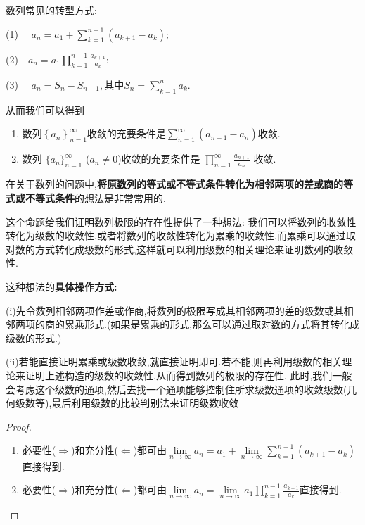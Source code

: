 \documentclass[../../main.tex]{subfiles}%
\begin{document}
\begin{proposition}[数列常见的转型方式]\label{proposition:数列收敛的级数与累乘形式}
数列常见的转型方式:

(1) $\quad a_n = a_1 + \sum_{k=1}^{n-1} \left( a_{k+1} - a_k \right); $

(2)$ \quad a_n = a_1 \prod_{k=1}^{n-1} \frac{a_{k+1}}{a_k}$; 

(3) $\quad a_n = S_n - S_{n-1}, \text{其中} S_n = \sum_{k=1}^n a_k.$

从而我们可以得到
\begin{enumerate}
\item 数列$\left\{ a_n \right\} _{n=1}^{\infty}$收敛的充要条件是$\sum\limits_{n=1}^{\infty}{\left( a_{n+1}-a_n \right)}$收敛.

\item 数列 \(\{ a_n \}_{n = 1}^{\infty}\) (\(a_n\neq 0\))收敛的充要条件是 \(\prod_{n = 1}^{\infty} \frac{a_{n + 1}}{a_n}\) 收敛.
\end{enumerate}
\end{proposition}
\begin{remark}
在关于数列的问题中,\textbf{将原数列的等式或不等式条件转化为相邻两项的差或商的等式或不等式条件}的想法是非常常用的.
\end{remark}
\begin{note}
这个命题给我们证明数列极限的存在性提供了一种想法:
我们可以将数列的收敛性转化为级数的收敛性,或者将数列的收敛性转化为累乘的收敛性.而累乘可以通过取对数的方式转化成级数的形式,这样就可以利用级数的相关理论来证明数列的收敛性.

这种想法的\textbf{具体操作方式:}

(i)先令数列相邻两项作差或作商,将数列的极限写成其相邻两项的差的级数或其相邻两项的商的累乘形式.(如果是累乘的形式,那么可以通过取对数的方式将其转化成级数的形式.)

(ii)若能直接证明累乘或级数收敛,就直接证明即可.若不能,则再利用级数的相关理论来证明上述构造的级数的收敛性,从而得到数列的极限的存在性.
此时,我们一般会考虑这个级数的通项,然后去找一个通项能够控制住所求级数通项的收敛级数(几何级数等),最后利用级数的比较判别法来证明级数收敛
\end{note}
\begin{proof}
\begin{enumerate}
\item 必要性($\Rightarrow$)和充分性($\Leftarrow$)都可由$\underset{n\rightarrow \infty}{\lim}a_n=a_1+\underset{n\rightarrow \infty}{\lim}\sum_{k=1}^{n-1}{\left( a_{k+1}-a_k \right)}$直接得到.

\item 必要性($\Rightarrow$)和充分性($\Leftarrow$)都可由$\underset{n\rightarrow \infty}{\lim}a_n=\underset{n\rightarrow \infty}{\lim}a_1\prod_{k=1}^{n-1}{\frac{a_{k+1}}{a_k}}$直接得到.
\end{enumerate}
\end{proof}
\end{document}
